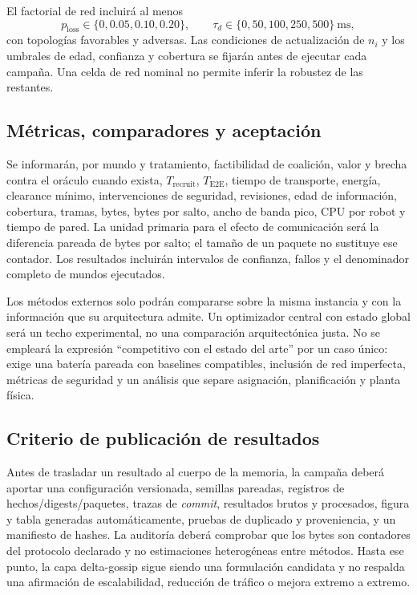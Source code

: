 El factorial de red incluirá al menos
\begin{equation*}
 p_{\mathrm{loss}}\in\{0,0.05,0.10,0.20\},\qquad
 \tau_d\in\{0,50,100,250,500\}\ \mathrm{ms},
\end{equation*}
con topologías favorables y adversas.
Las condiciones de actualización de $n_i$ y los umbrales de edad, confianza y
cobertura se fijarán antes de ejecutar cada campaña. Una celda de red nominal
no permite inferir la robustez de las restantes.

\subsection{Métricas, comparadores y aceptación}

Se informarán, por mundo y tratamiento, factibilidad de coalición, valor y
brecha contra el oráculo cuando exista, $T_{\mathrm{recruit}}$,
$T_{\mathrm{E2E}}$, tiempo de transporte, energía, clearance mínimo,
intervenciones de seguridad, revisiones, edad de información, cobertura,
tramas, bytes, bytes por salto, ancho de banda pico, CPU por robot y tiempo de
pared. La unidad primaria para el efecto de comunicación será la diferencia
pareada de bytes por salto; el tamaño de un paquete no sustituye ese contador.
Los resultados incluirán intervalos de confianza, fallos y el denominador
completo de mundos ejecutados.

Los métodos externos solo podrán compararse sobre la misma instancia y con la
información que su arquitectura admite. Un optimizador central con estado
global será un techo experimental, no una comparación arquitectónica justa.
No se empleará la expresión ``competitivo con el estado del arte'' por un caso
único: exige una batería pareada con baselines compatibles, inclusión de red
imperfecta, métricas de seguridad y un análisis que separe asignación,
planificación y planta física.

\subsection{Criterio de publicación de resultados}

Antes de trasladar un resultado al cuerpo de la memoria, la campaña deberá
aportar una configuración versionada, semillas pareadas, registros de
hechos/digests/paquetes, trazas de \emph{commit}, resultados brutos y
procesados, figura y tabla generadas automáticamente, pruebas de duplicado y
proveniencia, y un manifiesto de hashes. La auditoría deberá comprobar que los
bytes son contadores del protocolo declarado y no estimaciones heterogéneas
entre métodos. Hasta ese punto, la capa delta-gossip sigue siendo una
formulación candidata y no respalda una afirmación de escalabilidad, reducción
de tráfico o mejora extremo a extremo.
